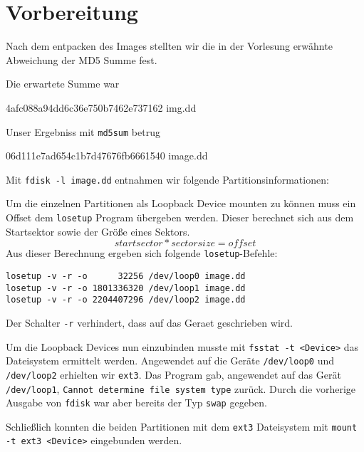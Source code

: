 \section{Vorbereitung}
Nach dem entpacken des Images stellten wir die in der Vorlesung erwähnte Abweichung der MD5 Summe fest.

Die erwartete Summe war
\begin{center}
4afc088a94dd6c36e750b7462e737162  img.dd
\end{center}
Unser Ergebniss mit \texttt{md5sum} betrug
\begin{center}
06d111e7ad654c1b7d47676fb6661540  image.dd
\end{center}
Mit \texttt{fdisk -l image.dd} entnahmen wir folgende Partitionsinformationen:
\lstset{basicstyle=\footnotesize}

Um die einzelnen Partitionen als Loopback Device mounten zu können muss ein Offset dem \texttt{losetup} Program übergeben werden. Dieser berechnet sich aus dem Startsektor sowie der Größe eines Sektors.\[startsector*sectorsize=offset\]
Aus dieser Berechnung ergeben sich folgende \texttt{losetup}-Befehle:

\begin{verbatim}
losetup -v -r -o      32256 /dev/loop0 image.dd
losetup -v -r -o 1801336320 /dev/loop1 image.dd
losetup -v -r -o 2204407296 /dev/loop2 image.dd
\end{verbatim}
\noindent Der Schalter \texttt{-r} verhindert, dass auf das Geraet geschrieben wird.

Um die Loopback Devices nun einzubinden musste mit \texttt{fsstat -t <Device>} das Dateisystem ermittelt werden. Angewendet auf die Geräte \texttt{/dev/loop0} und \texttt{/dev/loop2} erhielten wir \texttt{ext3}. Das Program gab, angewendet auf das Gerät \texttt{/dev/loop1}, \texttt{Cannot determine file system type} zurück. Durch die vorherige Ausgabe von \texttt{fdisk} war aber bereits der Typ \texttt{swap} gegeben.

Schließlich konnten die beiden Partitionen mit dem \texttt{ext3} Dateisystem mit \texttt{mount -t ext3 <Device>} eingebunden werden.